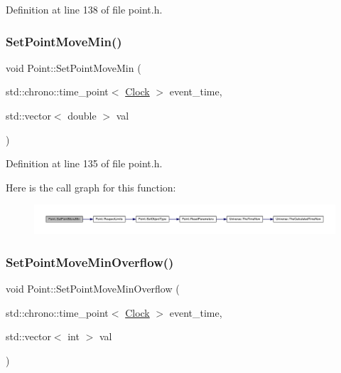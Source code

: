 Definition at line 138 of file point.\+h.

\mbox{\label{class_point_a287698b6f3ec6a610447fded5c3542ca}} 
\subsubsection{\texorpdfstring{Set\+Point\+Move\+Min()}{SetPointMoveMin()}}
{\footnotesize\ttfamily void Point\+::\+Set\+Point\+Move\+Min (\begin{DoxyParamCaption}\item[{std\+::chrono\+::time\+\_\+point$<$ \hyperlink{universe_8h_a0ef8d951d1ca5ab3cfaf7ab4c7a6fd80}{Clock} $>$}]{event\+\_\+time,  }\item[{std\+::vector$<$ double $>$}]{val }\end{DoxyParamCaption})\hspace{0.3cm}{\ttfamily [inline]}}



Definition at line 135 of file point.\+h.

Here is the call graph for this function\+:
\nopagebreak
\begin{figure}[H]
\begin{center}
\leavevmode
\includegraphics[width=350pt]{class_point_a287698b6f3ec6a610447fded5c3542ca_cgraph}
\end{center}
\end{figure}
\mbox{\label{class_point_a4a988ff988a3984545cf0c35e764c404}} 
\subsubsection{\texorpdfstring{Set\+Point\+Move\+Min\+Overflow()}{SetPointMoveMinOverflow()}}
{\footnotesize\ttfamily void Point\+::\+Set\+Point\+Move\+Min\+Overflow (\begin{DoxyParamCaption}\item[{std\+::chrono\+::time\+\_\+point$<$ \hyperlink{universe_8h_a0ef8d951d1ca5ab3cfaf7ab4c7a6fd80}{Clock} $>$}]{event\+\_\+time,  }\item[{std\+::vector$<$ int $>$}]{val }\end{DoxyParamCaption})\hspace{0.3cm}{\ttfamily [inline]}}



